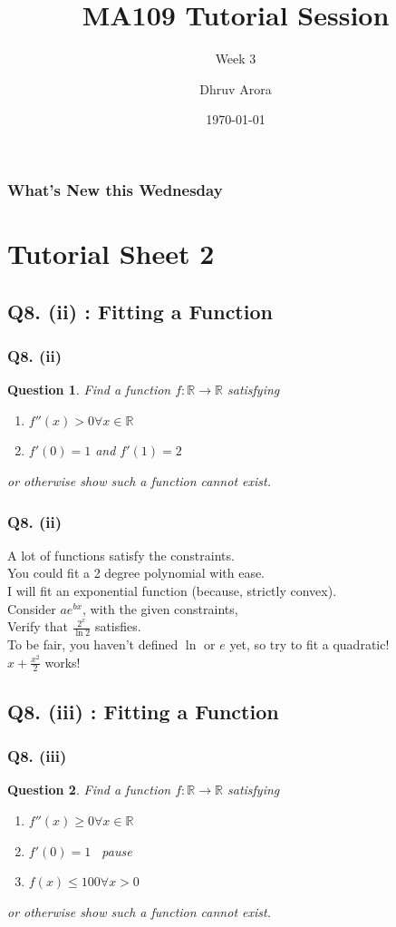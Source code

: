 \documentclass[handout,aspectratio=169]{beamer}
\title{MA109 Tutorial Session}
\subtitle{Week 3}
\author{Dhruv Arora}
\institute{Sophomore, Dept of CSE}
\date{\today}
\newtheorem{qsn}{Question}
\newcommand{\bR}{\mathbb{R}}
\begin{document}
\begin{frame}[plain]
\titlepage
\end{frame}

\begin{frame}[plain]
\frametitle{What's New this Wednesday}
\tableofcontents
\end{frame}

\section{Tutorial Sheet 2}

\subsection{Q8. (ii) : Fitting a Function}

\begin{frame}
\frametitle{Q8. (ii)}
\pause
\begin{qsn}
Find a function $f:\bR\to\bR$ satisfying \pause
\begin{enumerate}
\item $f''(x)>0 \forall x \in \bR$ \pause
\item $f'(0)=1$ and $f'(1)=2$ \pause
\end{enumerate}
or otherwise show such a function cannot exist.
\end{qsn}
\end{frame}

\begin{frame}
\frametitle{Q8. (ii)}
A lot of functions satisfy the constraints.\\ \pause
You could fit a 2 degree polynomial with ease. \\ \pause 
I will fit an exponential function (because, strictly convex). \\[1mm] \pause
Consider $ae^{bx}$, with the given constraints, \\ [1mm] \pause
Verify that $\frac{2^x}{\ln 2}$ satisfies. \\[2mm] \pause
\small To be fair, you haven't defined $\ln$ or $e$ yet, so try to fit a quadratic!\\[2mm]
$x+\frac{x^2}{2}$ works!
\end{frame}

\subsection{Q8. (iii) : Fitting a Function}

\begin{frame}
\frametitle{Q8. (iii)}
\pause
\begin{qsn}
Find a function $f:\bR\to\bR$ satisfying \pause
\begin{enumerate}
\item $f''(x)\geq 0 \forall x \in \bR$ \pause
\item $f'(0)=1$ \ pause
\item $f(x)\leq 100 \forall x>0$ \pause
\end{enumerate}
or otherwise show such a function cannot exist.
\end{qsn}
\end{frame}
\end{document}

